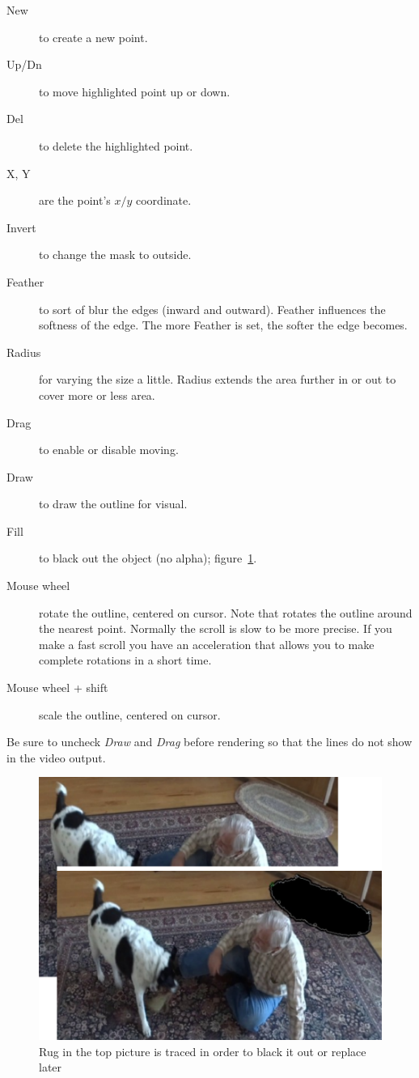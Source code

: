 {\begin{description}
	\item[New] to create a new point.
	\item[Up/Dn] to move highlighted point up or down.
	\item[Del] to delete the highlighted point.
	\item[X, Y] are the point’s $x/y$ coordinate.
	\item[Invert] to change the mask to outside.
	\item[Feather] to sort of blur the edges (inward and outward). Feather influences the softness of the edge. The more Feather is set, the softer the edge becomes.
	\item[Radius] for varying the size a little. Radius extends the area further in or out to cover more or less area.
	\item[Drag] to enable or disable moving.
	\item[Draw] to draw the outline for visual.
	\item[Fill] to black out the object (no alpha); figure~\ref{fig:tracer-02}.
	\item[Mouse wheel] rotate the outline, centered on cursor. Note that rotates the outline around the nearest point. Normally the scroll is slow to be more precise. If you make a fast scroll you have an acceleration that allows you to make complete rotations in a short time.
	\item[Mouse wheel + shift] scale the outline, centered on cursor.
\end{description}

Be sure to uncheck \textit{Draw} and \textit{Drag} before rendering so that the lines do not show in the video output.

\begin{figure}[hbtp]
	\centering
	\includegraphics[width=0.7\linewidth]{images/tracer-02.png}
	\caption{Rug in the top picture is traced in order to black it out or replace later}
	\label{fig:tracer-02}
\end{figure}

}
